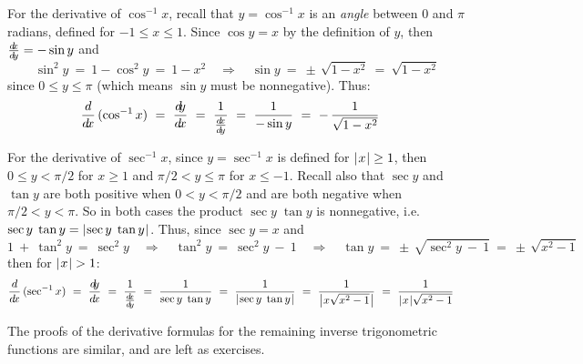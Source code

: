 For the derivative of $\cos^{-1} x$,
recall that $y = \cos^{-1} x$ is an \emph{angle} between $0$ and $\pi$ radians,
defined for $-1 \le x \le 1$. Since $\cos y = x$ by the definition of $y$, then
$\frac{d\negmedspace x}{d\!y} = -\sin y$ and
\begin{displaymath}
 \sin^2 y ~=~ 1 - \cos^2 y ~=~ 1 - x^2 \quad\Rightarrow\quad
 \sin y ~=~ \pm\,\sqrt{1 - x^2} ~=~ \sqrt{1 - x^2}
\end{displaymath}
since $0 \le y \le \pi$ (which means $\sin y$ must be nonnegative). Thus:
\begin{displaymath}
 \frac{d}{d\!x}\,(\cos^{-1} x) ~=~ \frac{d\negmedspace y}{d\!x} ~=~ \frac{1}{\frac{d\negmedspace x}{d\!y}} ~=~ \frac{1}{-\sin y} ~=~
  -\,\frac{1}{\sqrt{1 - x^2}} \quad\relax
 \end{displaymath}

For the derivative of $\sec^{-1} x$, since $y = \sec^{-1} x$ is defined for
$\lvert\mspace{1mu}x\mspace{1mu}\rvert \ge 1$, then  $0 \le y < \pi/2$ for $x \ge 1$ and $\pi/2 < y \le \pi$
for $x \le -1$. Recall also that $\sec y$ and $\tan y$ are both positive  when
$0 < y < \pi/2$ and are both negative when $\pi/2 < y < \pi$. So in both cases
the product $\sec y \; \tan y$ is nonnegative, i.e.
$\sec y \; \tan y = \lvert\mspace{1mu}\sec y \; \tan y\mspace{1mu}\rvert$. Thus, since $\sec y = x$ and
\begin{displaymath}
 1 ~+~ \tan^2 y ~=~ \sec^2 y \quad\Rightarrow\quad \tan^2 y ~=~ \sec^2 y ~-~ 1 \quad\Rightarrow\quad
 \tan y ~=~ \pm\,\sqrt{\sec^2 y ~-~ 1} ~=~ \pm\,\sqrt{x^2 - 1}
\end{displaymath}
then for $\lvert\mspace{1mu}x\mspace{1mu}\rvert > 1$:
\[
 \frac{d}{d\!x}\,(\sec^{-1} x) ~=~ \frac{d\negmedspace y}{d\!x} ~=~ \frac{1}{\frac{d\negmedspace x}{d\!y}} ~=~ \frac{1}{\sec y \; \tan y} ~=~
  \frac{1}{\lvert\mspace{1mu}\sec y \; \tan y\mspace{1mu}\rvert} ~=~ \frac{1}{\bigl\lvert\mspace{1mu}x \sqrt{x^2 - 1}\mspace{1mu}\bigr\rvert} ~=~
  \frac{1}{\lvert\mspace{1mu}x\mspace{1mu}\rvert\sqrt{x^2 - 1}} \quad\relax
 \]

\noindent The proofs of the derivative formulas for the remaining inverse
trigonometric functions are similar, and are left as exercises.

